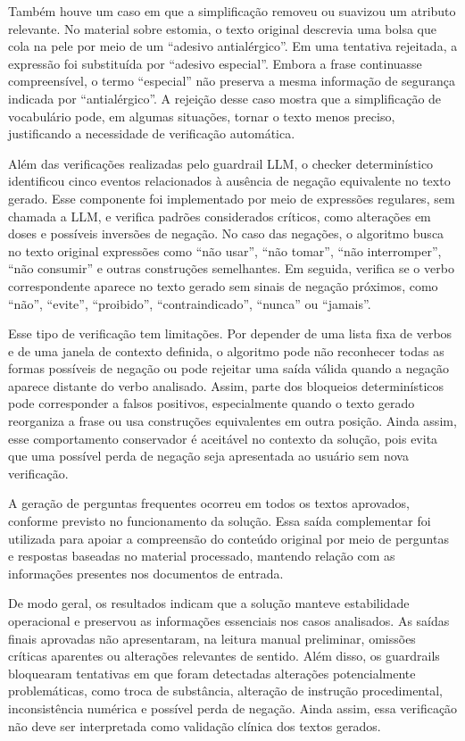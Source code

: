 Também houve um caso em que a simplificação removeu ou suavizou um atributo relevante. No material sobre estomia, o texto original descrevia uma bolsa que cola na pele por meio de um ``adesivo antialérgico''. Em uma tentativa rejeitada, a expressão foi substituída por ``adesivo especial''. Embora a frase continuasse compreensível, o termo ``especial'' não preserva a mesma informação de segurança indicada por ``antialérgico''. A rejeição desse caso mostra que a simplificação de vocabulário pode, em algumas situações, tornar o texto menos preciso, justificando a necessidade de verificação automática.

Além das verificações realizadas pelo guardrail LLM, o checker determinístico identificou cinco eventos relacionados à ausência de negação equivalente no texto gerado. Esse componente foi implementado por meio de expressões regulares, sem chamada a LLM, e verifica padrões considerados críticos, como alterações em doses e possíveis inversões de negação. No caso das negações, o algoritmo busca no texto original expressões como ``não usar'', ``não tomar'', ``não interromper'', ``não consumir'' e outras construções semelhantes. Em seguida, verifica se o verbo correspondente aparece no texto gerado sem sinais de negação próximos, como ``não'', ``evite'', ``proibido'', ``contraindicado'', ``nunca'' ou ``jamais''.

Esse tipo de verificação tem limitações. Por depender de uma lista fixa de verbos e de uma janela de contexto definida, o algoritmo pode não reconhecer todas as formas possíveis de negação ou pode rejeitar uma saída válida quando a negação aparece distante do verbo analisado. Assim, parte dos bloqueios determinísticos pode corresponder a falsos positivos, especialmente quando o texto gerado reorganiza a frase ou usa construções equivalentes em outra posição. Ainda assim, esse comportamento conservador é aceitável no contexto da solução, pois evita que uma possível perda de negação seja apresentada ao usuário sem nova verificação.

A geração de perguntas frequentes ocorreu em todos os textos aprovados, conforme previsto no funcionamento da solução. Essa saída complementar foi utilizada para apoiar a compreensão do conteúdo original por meio de perguntas e respostas baseadas no material processado, mantendo relação com as informações presentes nos documentos de entrada.

De modo geral, os resultados indicam que a solução manteve estabilidade operacional e preservou as informações essenciais nos casos analisados. As saídas finais aprovadas não apresentaram, na leitura manual preliminar, omissões críticas aparentes ou alterações relevantes de sentido. Além disso, os guardrails bloquearam tentativas em que foram detectadas alterações potencialmente problemáticas, como troca de substância, alteração de instrução procedimental, inconsistência numérica e possível perda de negação. Ainda assim, essa verificação não deve ser interpretada como validação clínica dos textos gerados.

